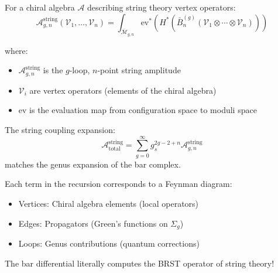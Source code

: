 \begin{theorem}[String Amplitude = Bar Complex Cohomology]\label{thm:string-amplitude}
For a chiral algebra $\mathcal{A}$ describing string theory vertex operators:
$$\mathcal{A}_{g,n}^{\text{string}}(\mathcal{V}_1,\ldots,\mathcal{V}_n) = \int_{\overline{\mathcal{M}}_{g,n}} \text{ev}^*\left(H^*(\bar{B}^{(g)}_n(\mathcal{V}_1 \otimes \cdots \otimes \mathcal{V}_n))\right)$$

where:
\begin{itemize}
\item $\mathcal{A}_{g,n}^{\text{string}}$ is the $g$-loop, $n$-point string amplitude
\item $\mathcal{V}_i$ are vertex operators (elements of the chiral algebra)
\item ev is the evaluation map from configuration space to moduli space
\end{itemize}

The string coupling expansion:
$$\mathcal{A}^{\text{string}}_{\text{total}} = \sum_{g=0}^\infty g_s^{2g-2+n} \mathcal{A}_{g,n}^{\text{string}}$$
matches the genus expansion of the bar complex.
\end{theorem}

\begin{remark}
Each term in the recursion corresponds to a Feynman diagram:
\begin{itemize}
\item Vertices: Chiral algebra elements (local operators)
\item Edges: Propagators (Green's functions on $\Sigma_g$)
\item Loops: Genus contributions (quantum corrections)
\end{itemize}
The bar differential literally computes the BRST operator of string theory!
\end{remark}

